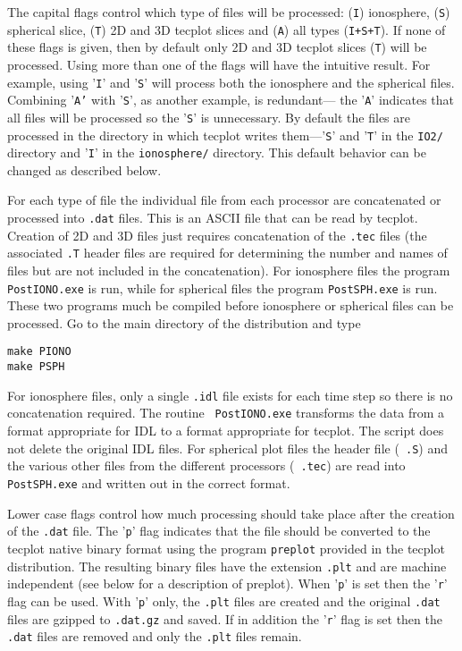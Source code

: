 The capital flags control which type of files will be processed:
({\tt I}) ionosphere, ({\tt S}) spherical slice, ({\tt T}) 2D and 3D tecplot slices
and ({\tt A}) all types ({\tt I+S+T}).  If none of these flags is given, then
by default only 2D and 3D tecplot slices ({\tt T}) will be processed.
Using more than one of the flags will have the intuitive result.
For example, using '{\tt I}' and '{\tt S}' will process both the ionosphere and
the spherical files.  Combining '{\tt A'} with '{\tt S}', as another example, is
redundant--- the '{\tt A}' indicates that all files will be processed so 
the '{\tt S}' is unnecessary.  By default the files are processed in the
directory in which tecplot writes them---'{\tt S}' and '{\tt T}' in the {\tt IO2/}
directory and '{\tt I}' in the {\tt ionosphere/} directory.  This
default behavior can be changed as described below.

For each type of file the individual file from each processor are
concatenated or processed into {\tt .dat} files.  This is an ASCII file
that can be read by tecplot.  Creation of 2D and 3D files just requires
concatenation of the {\tt .tec} files (the associated {\tt .T} header
files are required for determining the number and names of files but
are not included in the concatenation).  For ionosphere files the
program {\tt PostIONO.exe} is run, while for spherical files the
program {\tt PostSPH.exe} is run.  These two programs much be compiled
before ionosphere or spherical files can be processed.  Go to the main
directory of the distribution and type
\begin{verbatim}
make PIONO
make PSPH
\end{verbatim}
For ionosphere files, only a single {\tt .idl} file exists for each
time step so there is no concatenation required.  The routine {\tt
PostIONO.exe} transforms the data from a format appropriate for IDL to
a format appropriate for tecplot.  The script does not delete the
original IDL files.  For spherical plot files the header file ({\tt
.S}) and the various other files from the different processors ({\tt
.tec}) are read into {\tt PostSPH.exe} and written out in the correct
format.

Lower case flags control how much processing should take place after
the creation of the {\tt .dat} file.  The '{\tt p}' flag indicates that
the file should be converted to the tecplot native binary format using
the program {\tt preplot} provided in the tecplot distribution.  The
resulting binary files have the extension {\tt .plt} and are machine
independent (see below for a description of preplot).  When '{\tt p}'
is set then the '{\tt r}' flag can be used.  With '{\tt p}' only, the
{\tt .plt} files are created and the original {\tt .dat} files are
gzipped to {\tt.dat.gz} and saved.  If in addition the '{\tt r}' flag
is set then the {\tt .dat} files are removed and only the {\tt .plt}
files remain.

